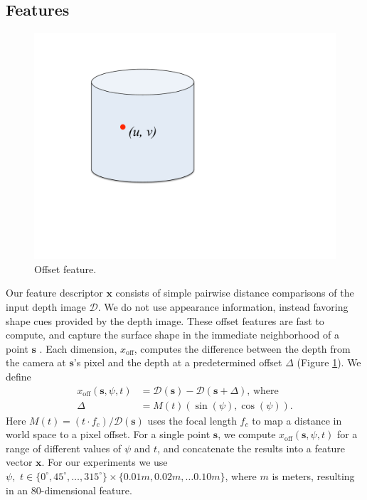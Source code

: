 \documentclass[10pt,twocolumn,letterpaper]{article}
\newcommand{\degree}{^{\circ}}
\newcommand{\feat}{\mathbf{x}}
\newcommand{\rgbdimage}{\mathcal{D}}
\newcommand{\pixelidx}{\mathbf{s}}
\newcommand{\note}[1]{\textcolor{blue}{NOTE: #1}}
\begin{document}
\subsection{Features}
\begin{figure}
  \vspace{-18pt}
  \centering
    \includegraphics[width=0.36\columnwidth, clip=true, trim=130 210 340 80, page=9]{spider_cobweb}
    \vspace{-12pt}
  \caption{Offset feature.}%
      \vspace{-8pt}
    \label{fig:offset_feature}
\end{figure}
Our feature descriptor $\mathbf{x}$ consists of simple pairwise distance comparisons of the input depth image $\rgbdimage$.
We do not use appearance information, instead favoring shape cues provided by the depth image.
These offset features are fast to compute, and capture the surface shape in the immediate neighborhood of a point $\pixelidx$ \cite{shotton-cvpr-2011}.
Each dimension, $x_\text{off}$, computes the difference between the depth from the camera at $\pixelidx$'s pixel and the depth at a predetermined offset $\Delta$ (Figure \ref{fig:offset_feature}). We define
\begin{align}
x_\text{off} (\pixelidx, \psi, t) &= \rgbdimage(\pixelidx) - \rgbdimage(\pixelidx + \Delta), \, \text{where} \\
\Delta &= M(t) (\sin(\psi), \cos(\psi)).
\end{align}
Here $M(t) = (t\cdotp f_c)/\rgbdimage(\pixelidx)$ uses the focal length $f_c$ to map a distance in world space to a pixel offset.
For a single point $\pixelidx$, we compute $x_\text{off} (\pixelidx, \psi, t)$ for a range of different values of $\psi$ and $t$, and concatenate the results into a feature vector $\feat$.
For our experiments we use $\psi, \,\, t \in \{0\degree, 45\degree, \ldots, 315\degree\} \times \{0.01m, 0.02m, \hdots 0.10m\}$, where $m$ is meters, resulting in an 80-dimensional feature.
\end{document}
